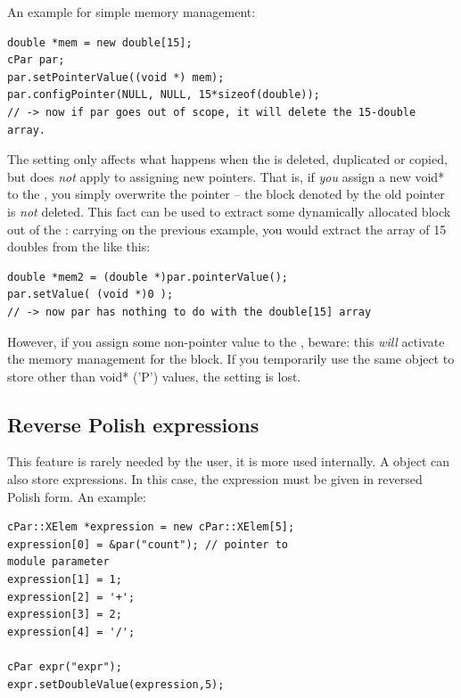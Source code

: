 An example for simple memory management:

\begin{verbatim}
double *mem = new double[15];
cPar par;
par.setPointerValue((void *) mem);
par.configPointer(NULL, NULL, 15*sizeof(double));
// -> now if par goes out of scope, it will delete the 15-double array.
\end{verbatim}

The  setting only affects what happens when the
 is deleted, duplicated or copied, but does \textit{not}
apply to assigning new pointers. That is, if \textit{you} assign a new
void* to the , you simply overwrite the pointer -- the
block denoted by the old pointer is \textit{not} deleted. This fact
can be used to extract some dynamically allocated block out of the
: carrying on the previous example, you would extract the
array of 15 doubles from the  like this:

\begin{verbatim}
double *mem2 = (double *)par.pointerValue();
par.setValue( (void *)0 );
// -> now par has nothing to do with the double[15] array
\end{verbatim}



However, if you assign some non-pointer value
to the , beware: this \textit{will} activate the memory
management for the block. If you temporarily use the same
 object to store other than void* ('P') values, the
 setting is lost.



\subsection{Reverse Polish expressions}

This feature is rarely needed by the user, it is more used internally.
A  object can also store
expressions. In this case, the expression must
be given in reversed Polish form. An
example:

\begin{verbatim}
cPar::XElem *expression = new cPar::XElem[5];
expression[0] = &par("count"); // pointer to
module parameter
expression[1] = 1;
expression[2] = '+';
expression[3] = 2;
expression[4] = '/';

cPar expr("expr");
expr.setDoubleValue(expression,5);
\end{verbatim}


